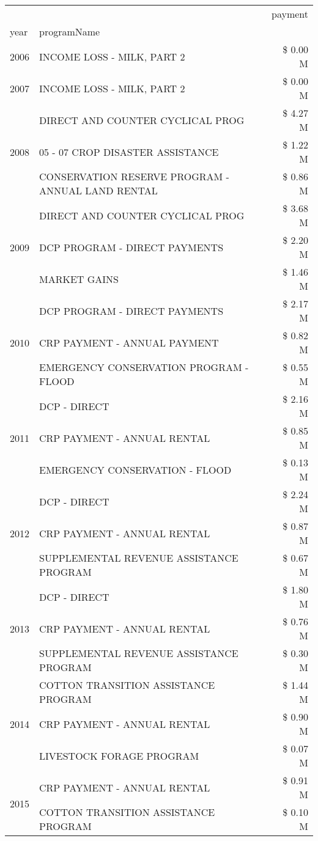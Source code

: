 \begin{tabular}{llr}
\toprule
 &  & payment \\
year & programName &  \\
\midrule
2006 & INCOME LOSS - MILK, PART 2 & \$ 0.00 M \\
\cline{1-3}
2007 & INCOME LOSS - MILK, PART 2 & \$ 0.00 M \\
\cline{1-3}
\multirow[t]{3}{*}{2008} & DIRECT AND COUNTER CYCLICAL PROG & \$ 4.27 M \\
 & 05 - 07 CROP DISASTER ASSISTANCE & \$ 1.22 M \\
 & CONSERVATION RESERVE PROGRAM - ANNUAL LAND RENTAL & \$ 0.86 M \\
\cline{1-3}
\multirow[t]{3}{*}{2009} & DIRECT AND COUNTER CYCLICAL PROG & \$ 3.68 M \\
 & DCP PROGRAM - DIRECT PAYMENTS & \$ 2.20 M \\
 & MARKET GAINS & \$ 1.46 M \\
\cline{1-3}
\multirow[t]{3}{*}{2010} & DCP PROGRAM - DIRECT PAYMENTS & \$ 2.17 M \\
 & CRP PAYMENT - ANNUAL PAYMENT & \$ 0.82 M \\
 & EMERGENCY CONSERVATION PROGRAM - FLOOD & \$ 0.55 M \\
\cline{1-3}
\multirow[t]{3}{*}{2011} & DCP - DIRECT & \$ 2.16 M \\
 & CRP PAYMENT - ANNUAL RENTAL & \$ 0.85 M \\
 & EMERGENCY CONSERVATION - FLOOD & \$ 0.13 M \\
\cline{1-3}
\multirow[t]{3}{*}{2012} & DCP - DIRECT & \$ 2.24 M \\
 & CRP PAYMENT - ANNUAL RENTAL & \$ 0.87 M \\
 & SUPPLEMENTAL REVENUE ASSISTANCE PROGRAM & \$ 0.67 M \\
\cline{1-3}
\multirow[t]{3}{*}{2013} & DCP - DIRECT & \$ 1.80 M \\
 & CRP PAYMENT - ANNUAL RENTAL & \$ 0.76 M \\
 & SUPPLEMENTAL REVENUE ASSISTANCE PROGRAM & \$ 0.30 M \\
\cline{1-3}
\multirow[t]{3}{*}{2014} & COTTON TRANSITION ASSISTANCE PROGRAM & \$ 1.44 M \\
 & CRP PAYMENT - ANNUAL RENTAL & \$ 0.90 M \\
 & LIVESTOCK FORAGE PROGRAM & \$ 0.07 M \\
\cline{1-3}
\multirow[t]{3}{*}{2015} & CRP PAYMENT - ANNUAL RENTAL & \$ 0.91 M \\
 & COTTON TRANSITION ASSISTANCE PROGRAM & \$ 0.10 M \\

\end{tabular}
